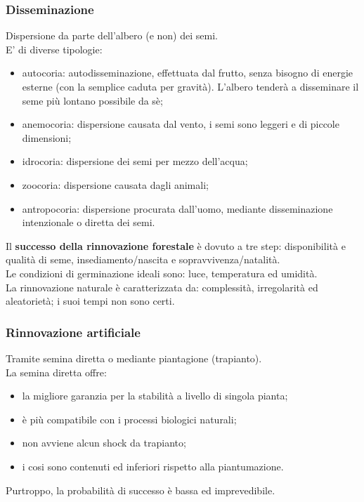 \documentclass{article}
\begin{document}
\subsubsection{Disseminazione}
Dispersione da parte dell'albero (e non) dei semi.\\
E' di diverse tipologie:
\begin{itemize}
    \item autocoria: autodisseminazione, effettuata dal frutto, senza bisogno di energie esterne (con la semplice caduta per gravità). L'albero tenderà a disseminare il seme più lontano possibile da sè;
    \item anemocoria: dispersione causata dal vento, i semi sono leggeri e di piccole dimensioni;
    \item idrocoria: dispersione dei semi per mezzo dell'acqua;
    \item zoocoria: dispersione causata dagli animali;
    \item antropocoria: dispersione procurata dall'uomo, mediante disseminazione intenzionale o diretta dei semi.
\end{itemize}
Il \textbf{successo della rinnovazione forestale} è dovuto a tre step: disponibilità e qualità di seme, insediamento/nascita e sopravvivenza/natalità.\\
Le condizioni di germinazione ideali sono: luce, temperatura ed umidità.\\
La rinnovazione naturale è caratterizzata da: complessità, irregolarità ed aleatorietà; i suoi tempi non sono certi.
\subsubsection{Rinnovazione artificiale}
Tramite semina diretta o mediante piantagione (trapianto).\\
La semina diretta offre:
\begin{itemize}
    \item la migliore garanzia per la stabilità a livello di singola pianta;
    \item è più compatibile con i processi biologici naturali;
    \item non avviene alcun shock da trapianto;
    \item i cosi sono contenuti ed inferiori rispetto alla piantumazione.
\end{itemize}
Purtroppo, la probabilità di successo è bassa ed imprevedibile. 
\end{document}

